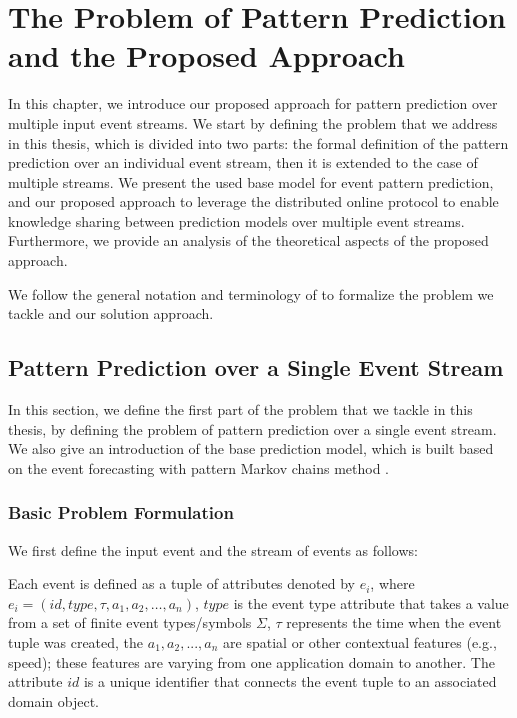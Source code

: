 \chapter{ The Problem of Pattern Prediction and the Proposed Approach }

\label{chapter:system}

\par In this chapter, we introduce our proposed approach for pattern prediction over multiple input event streams. We start by defining the problem that we address in this thesis, which is divided into two parts: the formal definition of the pattern prediction over an individual event stream, then it is extended to the case of multiple streams. We present the used base model for event pattern prediction, and our proposed approach to leverage the distributed online protocol to enable knowledge sharing between prediction models over multiple event streams. Furthermore, we provide an analysis of the theoretical aspects of the proposed approach.

\par We follow the general notation and terminology of \cite{agrawal2008efficient,schultz2009distributed,luckham2008power,alevizos2015complex,zhou_pattern_2015,kamp2014communication} to formalize the problem we tackle and our solution approach.


\section{Pattern Prediction over a Single Event Stream}


\par In this section, we define the first part of the problem that we tackle in this thesis, by defining the problem of pattern prediction over a single event stream. We also give an introduction of the base prediction model, which is built based on the event forecasting with pattern Markov chains method \cite{alevizos2017event}.


\subsection{Basic Problem Formulation}

We first define the input event and the stream of events as follows:  
\begin{definition}
	Each event is defined as a tuple of attributes denoted by $e_i$, where 
	$e_i = (id,type,\tau,a_1,a_2,\ldots,a_n)$, $type$ is the event type attribute that takes a value from a set of finite event types/symbols $\Sigma$, $\tau$ represents the time when the event tuple was created,  the  $a_1,a_2,...,a_n$ are spatial or other contextual features (e.g., speed); these features are varying from one application domain to another. The attribute $id$ is a unique identifier that connects the event tuple to an associated domain object.
\end{definition}

